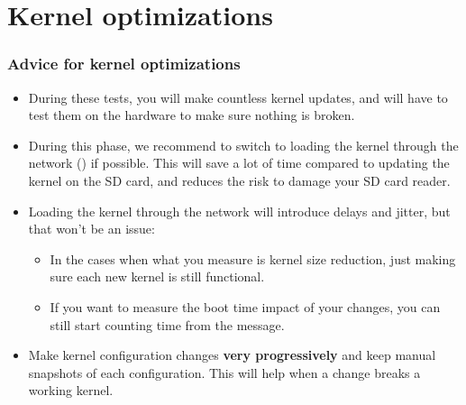 \section{Kernel optimizations}

\begin{frame}
\frametitle{Advice for kernel optimizations}
        \small
        \begin{itemize}
        \item During these tests, you will make countless kernel updates, and will
              have to test them on the hardware to make sure nothing is broken.
        \item During this phase, we recommend to switch to loading the kernel through
              the network () if possible. This will save a lot of time
              compared to updating the kernel on the SD card, and reduces the risk
              to damage your SD card reader.
        \item Loading the kernel through the network will introduce delays and jitter,
              but that won't be an issue:
              \begin{itemize}
              \item In the cases when what you measure is kernel size reduction, just
                    making sure each new kernel is still functional.
              \item If you want to measure the boot time impact of your changes,
                    you can still start counting time from the 
                    message.
              \end{itemize}
        \item Make kernel configuration changes {\bf very progressively} and keep
              manual snapshots of each configuration. This will help when a change
              breaks a working kernel.
        \end{itemize}
\end{frame}

